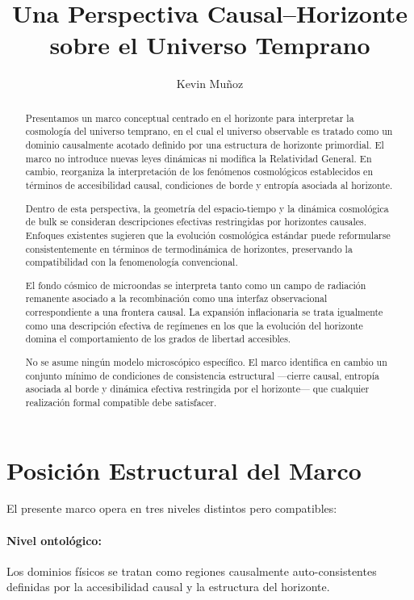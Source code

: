 \documentclass[12pt,a4paper]{article}
\title{Una Perspectiva Causal--Horizonte sobre el Universo Temprano}
\author{Kevin Mu\~noz}
\date{}
\begin{document}
\maketitle

\begin{abstract}
Presentamos un marco conceptual centrado en el horizonte para interpretar la cosmología del universo temprano, en el cual el universo observable es tratado como un dominio causalmente acotado definido por una estructura de horizonte primordial. El marco no introduce nuevas leyes dinámicas ni modifica la Relatividad General. En cambio, reorganiza la interpretación de los fenómenos cosmológicos establecidos en términos de accesibilidad causal, condiciones de borde y entropía asociada al horizonte.

Dentro de esta perspectiva, la geometría del espacio-tiempo y la dinámica cosmológica de bulk se consideran descripciones efectivas restringidas por horizontes causales. Enfoques existentes sugieren que la evolución cosmológica estándar puede reformularse consistentemente en términos de termodinámica de horizontes, preservando la compatibilidad con la fenomenología convencional.

El fondo cósmico de microondas se interpreta tanto como un campo de radiación remanente asociado a la recombinación como una interfaz observacional correspondiente a una frontera causal. La expansión inflacionaria se trata igualmente como una descripción efectiva de regímenes en los que la evolución del horizonte domina el comportamiento de los grados de libertad accesibles.

No se asume ningún modelo microscópico específico. El marco identifica en cambio un conjunto mínimo de condiciones de consistencia estructural ---cierre causal, entropía asociada al borde y dinámica efectiva restringida por el horizonte--- que cualquier realización formal compatible debe satisfacer.
\end{abstract}

\setcounter{section}{-1}
\section{Posición Estructural del Marco}

El presente marco opera en tres niveles distintos pero compatibles:

\paragraph{Nivel ontológico:} Los dominios físicos se tratan como regiones causalmente auto-consistentes definidas por la accesibilidad causal y la estructura del horizonte.
\end{document}
